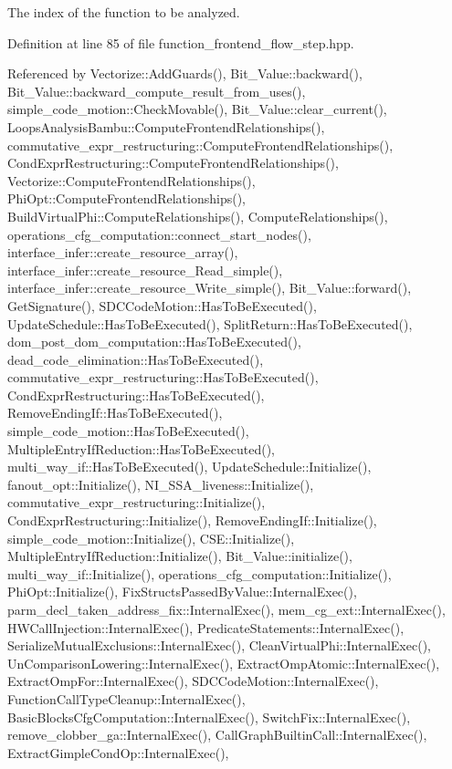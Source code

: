 The index of the function to be analyzed. 



Definition at line 85 of file function\+\_\+frontend\+\_\+flow\+\_\+step.\+hpp.



Referenced by Vectorize\+::\+Add\+Guards(), Bit\+\_\+\+Value\+::backward(), Bit\+\_\+\+Value\+::backward\+\_\+compute\+\_\+result\+\_\+from\+\_\+uses(), simple\+\_\+code\+\_\+motion\+::\+Check\+Movable(), Bit\+\_\+\+Value\+::clear\+\_\+current(), Loops\+Analysis\+Bambu\+::\+Compute\+Frontend\+Relationships(), commutative\+\_\+expr\+\_\+restructuring\+::\+Compute\+Frontend\+Relationships(), Cond\+Expr\+Restructuring\+::\+Compute\+Frontend\+Relationships(), Vectorize\+::\+Compute\+Frontend\+Relationships(), Phi\+Opt\+::\+Compute\+Frontend\+Relationships(), Build\+Virtual\+Phi\+::\+Compute\+Relationships(), Compute\+Relationships(), operations\+\_\+cfg\+\_\+computation\+::connect\+\_\+start\+\_\+nodes(), interface\+\_\+infer\+::create\+\_\+resource\+\_\+array(), interface\+\_\+infer\+::create\+\_\+resource\+\_\+\+Read\+\_\+simple(), interface\+\_\+infer\+::create\+\_\+resource\+\_\+\+Write\+\_\+simple(), Bit\+\_\+\+Value\+::forward(), Get\+Signature(), S\+D\+C\+Code\+Motion\+::\+Has\+To\+Be\+Executed(), Update\+Schedule\+::\+Has\+To\+Be\+Executed(), Split\+Return\+::\+Has\+To\+Be\+Executed(), dom\+\_\+post\+\_\+dom\+\_\+computation\+::\+Has\+To\+Be\+Executed(), dead\+\_\+code\+\_\+elimination\+::\+Has\+To\+Be\+Executed(), commutative\+\_\+expr\+\_\+restructuring\+::\+Has\+To\+Be\+Executed(), Cond\+Expr\+Restructuring\+::\+Has\+To\+Be\+Executed(), Remove\+Ending\+If\+::\+Has\+To\+Be\+Executed(), simple\+\_\+code\+\_\+motion\+::\+Has\+To\+Be\+Executed(), Multiple\+Entry\+If\+Reduction\+::\+Has\+To\+Be\+Executed(), multi\+\_\+way\+\_\+if\+::\+Has\+To\+Be\+Executed(), Update\+Schedule\+::\+Initialize(), fanout\+\_\+opt\+::\+Initialize(), N\+I\+\_\+\+S\+S\+A\+\_\+liveness\+::\+Initialize(), commutative\+\_\+expr\+\_\+restructuring\+::\+Initialize(), Cond\+Expr\+Restructuring\+::\+Initialize(), Remove\+Ending\+If\+::\+Initialize(), simple\+\_\+code\+\_\+motion\+::\+Initialize(), C\+S\+E\+::\+Initialize(), Multiple\+Entry\+If\+Reduction\+::\+Initialize(), Bit\+\_\+\+Value\+::initialize(), multi\+\_\+way\+\_\+if\+::\+Initialize(), operations\+\_\+cfg\+\_\+computation\+::\+Initialize(), Phi\+Opt\+::\+Initialize(), Fix\+Structs\+Passed\+By\+Value\+::\+Internal\+Exec(), parm\+\_\+decl\+\_\+taken\+\_\+address\+\_\+fix\+::\+Internal\+Exec(), mem\+\_\+cg\+\_\+ext\+::\+Internal\+Exec(), H\+W\+Call\+Injection\+::\+Internal\+Exec(), Predicate\+Statements\+::\+Internal\+Exec(), Serialize\+Mutual\+Exclusions\+::\+Internal\+Exec(), Clean\+Virtual\+Phi\+::\+Internal\+Exec(), Un\+Comparison\+Lowering\+::\+Internal\+Exec(), Extract\+Omp\+Atomic\+::\+Internal\+Exec(), Extract\+Omp\+For\+::\+Internal\+Exec(), S\+D\+C\+Code\+Motion\+::\+Internal\+Exec(), Function\+Call\+Type\+Cleanup\+::\+Internal\+Exec(), Basic\+Blocks\+Cfg\+Computation\+::\+Internal\+Exec(), Switch\+Fix\+::\+Internal\+Exec(), remove\+\_\+clobber\+\_\+ga\+::\+Internal\+Exec(), Call\+Graph\+Builtin\+Call\+::\+Internal\+Exec(), Extract\+Gimple\+Cond\+Op\+::\+Internal\+Exec(), 